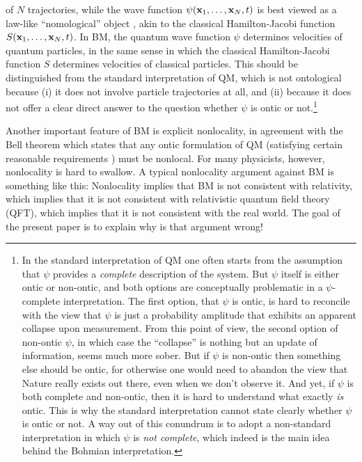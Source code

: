 \documentclass[12pt]{article}
\begin{document}
of $N$ trajectories, while the wave function $\psi({\bf x}_1,\ldots,{\bf x}_N,t)$ 
is best viewed as a law-like ``nomological'' object \cite{nomological}, 
akin to the classical Hamilton-Jacobi function $S({\bf x}_1,\ldots,{\bf x}_N,t)$. 
In BM, the quantum wave function $\psi$ determines velocities of quantum particles, in the same sense in which
the classical Hamilton-Jacobi function $S$ determines velocities of classical particles.
This should be distinguished from the standard interpretation of QM, which is not ontological because (i) it 
does not involve particle trajectories at all,
and (ii) because it does not offer a clear direct answer to the question 
whether $\psi$ is ontic or not.\footnote{In the standard interpretation of QM one often starts 
from the assumption that $\psi$ provides a {\em complete} description of the system. But 
$\psi$ itself is either ontic or non-ontic, and both options are conceptually problematic 
in a $\psi$-complete interpretation. The first option, that $\psi$ is ontic, is hard to reconcile with the view that
$\psi$ is just a probability amplitude that exhibits an apparent collapse upon measurement.
From this point of view, the second option of non-ontic $\psi$, 
in which case the ``collapse'' is nothing but an update of information,
seems much more sober. But if $\psi$ is non-ontic then something else should be ontic,
for otherwise one would need to abandon the view that Nature really exists out there, even when we don't observe it.  
And yet, if $\psi$ is both complete and non-ontic, then it is hard to understand what exactly {\em is} ontic.
This is why the standard interpretation cannot state clearly whether $\psi$ is ontic or not.  
A way out of this conundrum is to adopt a non-standard interpretation
in which $\psi$ is {\em not complete}, which indeed is the main idea behind the Bohmian interpretation.}  

Another important feature of BM is explicit nonlocality, in agreement with the Bell theorem \cite{bell,schol}
which states that any ontic formulation of QM (satisfying certain reasonable requirements \cite{tumulka}) 
must be nonlocal.  
For many physicists, however, nonlocality is hard to swallow. A typical nonlocality argument
against BM is something like this: Nonlocality implies that BM is not consistent with relativity,
which implies that it is not consistent with relativistic quantum field theory (QFT),
which implies that it is not consistent with the real world.
The goal of the present paper is to explain why is that argument wrong!
  
\end{document}
